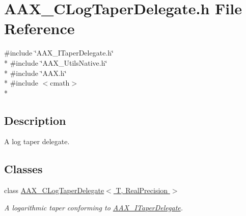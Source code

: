 \hypertarget{a00176}{}\section{A\+A\+X\+\_\+\+C\+Log\+Taper\+Delegate.\+h File Reference}
\label{a00176}
{\ttfamily \#include \char`\"{}A\+A\+X\+\_\+\+I\+Taper\+Delegate.\+h\char`\"{}}\\*
{\ttfamily \#include \char`\"{}A\+A\+X\+\_\+\+Utils\+Native.\+h\char`\"{}}\\*
{\ttfamily \#include \char`\"{}A\+A\+X.\+h\char`\"{}}\\*
{\ttfamily \#include $<$cmath$>$}\\*


\subsection{Description}
A log taper delegate. 

\subsection*{Classes}
\begin{DoxyCompactItemize}
\item 
class \hyperlink{a00023}{A\+A\+X\+\_\+\+C\+Log\+Taper\+Delegate$<$ T, Real\+Precision $>$}
\begin{DoxyCompactList}\small\item\em A logarithmic taper conforming to \hyperlink{a00114}{A\+A\+X\+\_\+\+I\+Taper\+Delegate}. \end{DoxyCompactList}\end{DoxyCompactItemize}
